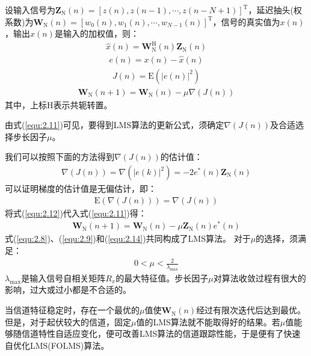 设输入信号为$\mathbf{Z}_{\mathrm{N}}(n)=[z(n),z(n-1),\cdots,z(n-N+1)]^{\mathrm{T}}$，延迟抽头(权系数)为$\mathbf{W}_{\mathrm{N}}(n)=[w_0(n),w_1(n),\cdots,w_{N-1}(n)]^{\mathrm{T}}$，信号的真实值为$x(n)$，输出$\hat{x}(n)$是输入的加权值，则：
\begin{eqnarray}
    \hat{x}(n)=\mathbf{W}_{\mathrm{N}}^{\mathrm{H}}(n)\mathbf{Z}_{\mathrm{N}}(n)
    \label{equ:2.8}
\end{eqnarray}
\begin{eqnarray}
    e(n)=x(n)-\hat{x}(n)
    \label{equ:2.9}
\end{eqnarray}
\begin{eqnarray}
    J(n)=\mathrm{E}(|e(n)|^2)
    \label{equ:2.10}
\end{eqnarray}
\begin{eqnarray}
    \mathbf{W}_{\mathrm{N}}(n+1)=\mathbf{W}_{\mathrm{N}}(n)-\mu\nabla(J(n))
    \label{equ:2.11}
\end{eqnarray}
其中，上标$\mathrm{H}$表示共轭转置。

由式(\ref{equ:2.11})可见，要得到LMS算法的更新公式，须确定$\nabla(J(n))$及合适选择步长因子$\mu$。

我们可以按照下面的方法得到$\nabla(J(n))$的估计值：
\begin{eqnarray}
    \nabla(J(n))=\nabla(|e(k)|^2)=-2e^*(n)\mathbf{Z}_{\mathrm{N}}(n)
    \label{equ:2.12}
\end{eqnarray}
可以证明梯度的估计值是无偏估计，即：
\begin{eqnarray}
    \mathrm{E}(\nabla(J(n)))=\nabla(J(n))
    \label{equ:2.13}
\end{eqnarray}
将式(\ref{equ:2.12})代入式(\ref{equ:2.11})得：
\begin{eqnarray}
    \mathbf{W}_{\mathrm{N}}(n+1)=\mathbf{W}_{\mathrm{N}}(n)-\mu\mathbf{Z}_{\mathrm{N}}(n)e^*(n)
    \label{equ:2.14}
\end{eqnarray}
式(\ref{equ:2.8})、(\ref{equ:2.9})和(\ref{equ:2.14})共同构成了LMS算法。
对于$\mu$的选择，须满足：
\begin{eqnarray}
    0<\mu<\frac{2}{\lambda_{\mathrm{max}}}
    \label{equ:2.15}
\end{eqnarray}
$\lambda_{\mathrm{max}}$是输入信号自相关矩阵$R_x$的最大特征值。步长因子$\mu$对算法收敛过程有很大的影响，过大或过小都是不合适的。

当信道特征稳定时，存在一个最优的$\mu$值使$\mathbf{W}_{\mathrm{N}}(n)$经过有限次迭代后达到最优。但是，对于起伏较大的信道，固定$\mu$值的LMS算法就不能取得好的结果。若$\mu$值能够随信道特性自适应变化，便可改善LMS算法的信道跟踪性能，于是便有了快速自优化LMS(FOLMS)算法。
